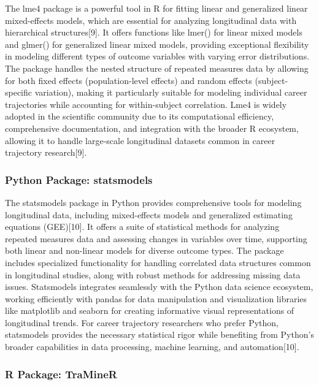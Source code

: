 \documentclass[
  letterpaper,
  DIV=11,
  numbers=noendperiod]{scrartcl}
\begin{document}
The lme4 package is a powerful tool in R for fitting linear and
generalized linear mixed-effects models, which are essential for
analyzing longitudinal data with hierarchical structures{[}9{]}. It
offers functions like lmer() for linear mixed models and glmer() for
generalized linear mixed models, providing exceptional flexibility in
modeling different types of outcome variables with varying error
distributions. The package handles the nested structure of repeated
measures data by allowing for both fixed effects (population-level
effects) and random effects (subject-specific variation), making it
particularly suitable for modeling individual career trajectories while
accounting for within-subject correlation. Lme4 is widely adopted in the
scientific community due to its computational efficiency, comprehensive
documentation, and integration with the broader R ecosystem, allowing it
to handle large-scale longitudinal datasets common in career trajectory
research{[}9{]}.

\subsubsection{Python Package:
statsmodels}\label{python-package-statsmodels}

The statsmodels package in Python provides comprehensive tools for
modeling longitudinal data, including mixed-effects models and
generalized estimating equations (GEE){[}10{]}. It offers a suite of
statistical methods for analyzing repeated measures data and assessing
changes in variables over time, supporting both linear and non-linear
models for diverse outcome types. The package includes specialized
functionality for handling correlated data structures common in
longitudinal studies, along with robust methods for addressing missing
data issues. Statsmodels integrates seamlessly with the Python data
science ecosystem, working efficiently with pandas for data manipulation
and visualization libraries like matplotlib and seaborn for creating
informative visual representations of longitudinal trends. For career
trajectory researchers who prefer Python, statsmodels provides the
necessary statistical rigor while benefiting from Python's broader
capabilities in data processing, machine learning, and
automation{[}10{]}.

\subsubsection{R Package: TraMineR}\label{r-package-traminer}
\end{document}

